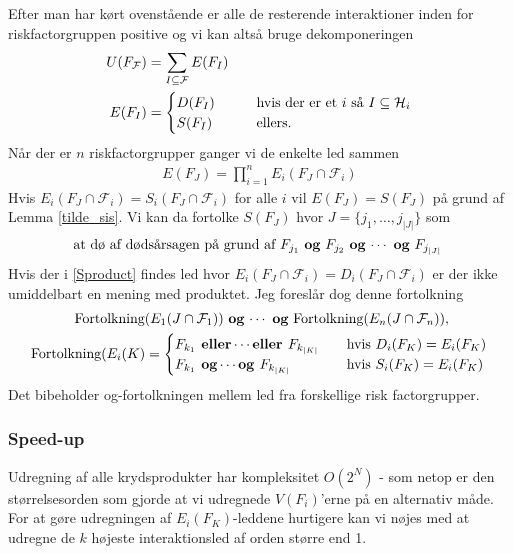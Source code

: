 \documentclass[a4paper, 12pt]{article}
\begin{document}
Efter man har kørt ovenstående er alle de resterende interaktioner inden for riskfactorgruppen positive og vi kan altså bruge dekomponeringen
\begin{align}
U(F_{\mathcal F})&=\sum_{I\subseteq \mathcal F} E(F_I)\\
E(F_I)&=\begin{cases}
D(F_I) \qquad & \textup{hvis der er et $i$ så } I\subseteq \mathcal H_i\\
S(F_I) \qquad & \textup{ellers.}
\end{cases}
\end{align}
Når der er $n$ riskfactorgrupper ganger vi de enkelte led sammen
\begin{align}
E(F_J)=\prod_{i=1}^nE_i(F_J\cap \mathcal F_i)\label{Sproduct}
\end{align}
Hvis $E_i(F_J\cap \mathcal F_i)=S_i(F_J\cap \mathcal F_i)$ for alle $i$ vil $E(F_J)=S(F_J)$ på grund af Lemma \ref{tilde_sis}. Vi kan da fortolke $S(F_J)$ hvor $J=\{j_1, \dots, j_{|J|}\}$ som
\begin{equation}
\textup{at dø af dødsårsagen på grund af $F_{j_1}$ \textbf{og} $F_{j_2}$ \textbf{og} $\cdots$ \textbf{og} $F_{j_{|J|}}$ }
\end{equation}
Hvis der i \eqref{Sproduct} findes led hvor $E_i(F_J\cap \mathcal F_i)=D_i(F_J\cap \mathcal F_i)$ er der ikke umiddelbart en mening med produktet. Jeg foreslår dog denne fortolkning
\begin{gather}
\textup{ Fortolkning($E_1(J\cap \mathcal F_1)$) \textbf{og} $\cdots$ \textbf{og} Fortolkning($E_n(J\cap \mathcal F_n)$)},\\
\textup{Fortolkning}(E_i(K)=\begin{cases}
F_{k_1} \textbf{ eller}\cdots \textbf{eller } F_{k_{|K|}} \quad &\textup{hvis } D_i(F_K)=E_i(F_K)\\
F_{k_1} \textbf{ og}\cdots \textbf{og } F_{k_{|K|}} \quad &\textup{hvis } S_i(F_K)=E_i(F_K)\\
\end{cases}
\end{gather}
Det bibeholder og-fortolkningen mellem led fra forskellige risk factorgrupper. 

\subsubsection{Speed-up}

Udregning af alle krydsprodukter har kompleksitet $O(2^N)$ - som netop er den størrelsesorden som gjorde at vi udregnede $ V(F_i)$'erne på en alternativ måde. For at gøre udregningen af $E_i(F_K)$-leddene hurtigere kan  vi nøjes med at udregne de $k$ højeste interaktionsled af orden større end 1. 
\end{document}
